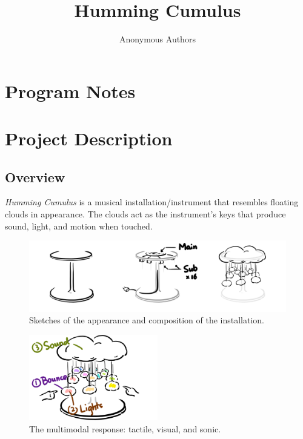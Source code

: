 \documentclass{nimemusic}
\begin{document}
\newcommand{\CuHum}{\textit{Humming Cumulus}}
\title{Humming Cumulus}

\author{Anonymous Authors}

\renewcommand{\shortauthors}{Authors, et al.}


\maketitle


\section{Program Notes}

\section{Project Description}
\subsection{Overview}
\CuHum{} is a musical installation/instrument that resembles floating clouds in appearance. The clouds act as the instrument's keys that produce sound, light, and motion when touched.

\begin{figure}[h!]
  \includegraphics[width=1\textwidth]{Sketches.png}
  \caption{Sketches of the appearance and composition of the installation.}
  \label{fig:Sketches}
\end{figure}

\begin{figure}[h!]
  \includegraphics[width=0.5\textwidth]{Response.png}
  \caption{The multimodal response: tactile, visual, and sonic.}
  \label{fig:Response}
\end{figure}
\end{document}
